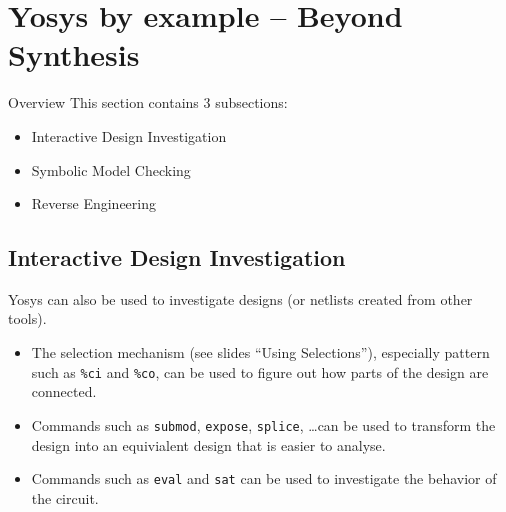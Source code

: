 
\section{Yosys by example -- Beyond Synthesis}

\begin{frame}
\sectionpage
\end{frame}

\begin{frame}{Overview}
This section contains 3 subsections:
\begin{itemize}
\item Interactive Design Investigation
\item Symbolic Model Checking
\item Reverse Engineering
\end{itemize}
\end{frame}


\subsection{Interactive Design Investigation}

\begin{frame}
\subsectionpage
\subsectionpagesuffix
\end{frame}

\begin{frame}{\subsecname}
Yosys can also be used to investigate designs (or netlists created
from other tools).

\begin{itemize}
\item
The selection mechanism (see slides ``Using Selections''), especially pattern such
as {\tt \%ci} and {\tt \%co}, can be used to figure out how parts of the design
are connected.

\item
Commands such as {\tt submod}, {\tt expose}, {\tt splice}, \dots can be used 
to transform the design into an equivialent design that is easier to analyse.

\item
Commands such as {\tt eval} and {\tt sat} can be used to investigate the
behavior of the circuit.
\end{itemize}
\end{frame}

